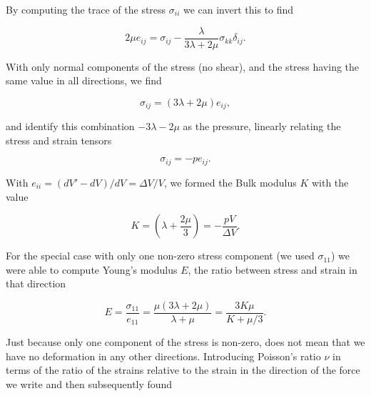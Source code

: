 By computing the trace of the stress $\sigma_{ii}$ we can invert this to find

\begin{equation}\label{eqn:continuumElasticityReview:330}
2 \mu e_{ij} = \sigma_{ij} - \frac{\lambda}{3 \lambda + 2 \mu} \sigma_{kk} \delta_{ij}.
\end{equation}


With only normal components of the stress (no shear), and the stress having the same value in all directions, we find

\begin{equation}\label{eqn:continuumElasticityReview:350}
\sigma_{ij} = ( 3 \lambda + 2 \mu ) e_{ij},
\end{equation}

and identify this combination $-3 \lambda - 2 \mu$ as the pressure, linearly relating the stress and strain tensors

\begin{equation}\label{eqn:continuumElasticityReview:370}
\sigma_{ij} = -p e_{ij}.
\end{equation}

With $e_{ii} = (dV' - dV)/dV = \Delta V/V$, we formed the Bulk modulus $K$ with the value

\begin{equation}\label{eqn:continuumElasticityReview:390}
K = \left( \lambda + \frac{2 \mu}{3} \right) = -\frac{p V}{\Delta V}.
\end{equation}


For the special case with only one non-zero stress component (we used $\sigma_{11}$) we were able to compute Young's modulus $E$, the ratio between stress and strain in that direction

\begin{equation}\label{eqn:continuumElasticityReview:410}
E = \frac{\sigma_{11}}{e_{11}} = \frac{\mu(3 \lambda + 2 \mu)}{\lambda + \mu }  = \frac{3 K \mu}{K + \mu/3}.
\end{equation}

Just because only one component of the stress is non-zero, does not mean that we have no deformation in any other directions.  Introducing Poisson's ratio $\nu$ in terms of the ratio of the strains relative to the strain in the direction of the force we write and then subsequently found

